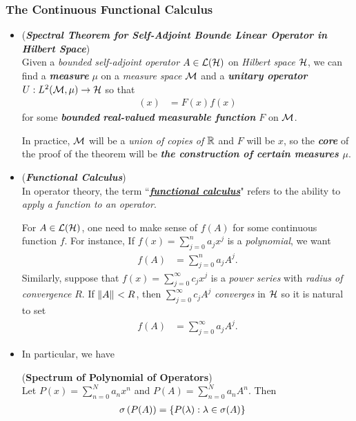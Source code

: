 \documentclass[11pt]{article}
\begin{document}
\subsubsection{The Continuous Functional Calculus}
\begin{itemize}
\item \begin{remark}  (\textbf{\emph{Spectral Theorem for Self-Adjoint Bounde Linear Operator in Hilbert Space}})\\ 
Given a \emph{bounded self-adjoint operator} $A \in {\mathcal L}({\mathcal H})$ on \emph{Hilbert space} ${\mathcal H}$, we can find a \emph{\textbf{measure}} $\mu$ on a \emph{measure space ${\mathcal M}$} and a 
\emph{\textbf{unitary operator}} $U: L^2({\mathcal M}, \mu) \to {\mathcal H} $ so that 
\begin{align*}
[U^{-1} A U f](x) &= F(x) f(x)
\end{align*} for some \emph{\textbf{bounded} \textbf{real-valued} \textbf{measurable function} $F$} on ${\mathcal M}$. 

In practice, ${\mathcal M}$ will be a \emph{union of copies of ${\mathbb R}$} and $F$ will be $x$,  so the \emph{\textbf{core}} of the proof of the theorem will be \emph{\textbf{the construction of certain measures $\mu$}}.  
\end{remark}

\item \begin{remark} (\emph{\textbf{Functional Calculus}}) \citep{borthwick2020spectral} \\
In operator theory, the term ``\underline{\emph{\textbf{functional calculus}}}" refers to the ability to \emph{apply a function to an operator}.

For $A \in {\mathcal L}({\mathcal H})$, one need to make sense of $f(A)$ for some continuous function $f$. For instance, If $f(x) = \sum_{j=0}^{n}a_j x^j$ is a \emph{polynomial}, 
we want 
\begin{align*}
f(A) &=  \sum_{j=0}^{n}a_j A^j.
\end{align*} Similarly, suppose that $f(x) = \sum_{j=0}^{\infty}c_j x^j$  is a \emph{power series} with \emph{radius of convergence} $R$. If $\left\|A\right\|_{} < R$, then $ \sum_{j=0}^{\infty}c_j A^j$ \emph{converges} in ${\mathcal H}$ so it is natural to set 
\begin{align*}
f(A) &=  \sum_{j=0}^{\infty}a_j A^j.
\end{align*}
\end{remark}

\item In particular, we have
\begin{lemma} (\textbf{Spectrum of Polynomial of Operators}) \citep{reed1980methods}\\
Let $P(x) = \sum_{n=0}^{N}a_n x^n$ and $P(A) =  \sum_{n=0}^{N}a_n A^n$. Then 
\begin{align*}
\sigma\left(P(A)\right) &= \left\{P(\lambda): \lambda \in \sigma(A)\right\}
\end{align*}
\end{lemma}


\end{itemize}
\end{document}
